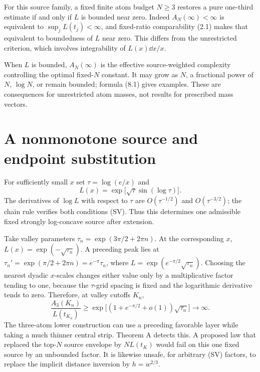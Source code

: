For this source family, a fixed finite atom budget $N\ge3$ restores a pure one-third estimate if and only if $L$ is bounded near zero. Indeed $A_N(\infty)<\infty$ is equivalent to $\sup_j L(t_j)<\infty$, and fixed-ratio comparability (2.1) makes that equivalent to boundedness of $L$ near zero. This differs from the unrestricted criterion, which involves integrability of $L(x)\dd x/x$.

When $L$ is bounded, $A_N(\infty)$ is the effective source-weighted complexity controlling the optimal fixed-$N$ constant. It may grow as $N$, a fractional power of $N$, $\log N$, or remain bounded; formula (8.1) gives examples. These are consequences for unrestricted atom masses, not results for prescribed mass vectors.

\section{A nonmonotone source and endpoint substitution}
For sufficiently small $x$ set $\tau=\log(e/x)$ and
\begin{equation}
 L(x)=\exp\bigl[\sqrt\tau\sin(\log\tau)\bigr].\tag{10.1}
\end{equation}
The derivatives of $\log L$ with respect to $\tau$ are $O(\tau^{-1/2})$ and $O(\tau^{-3/2})$; the chain rule verifies both conditions (SV). Thus this determines one admissible fixed strongly log-concave source after extension.

Take valley parameters $\tau_n=\exp(3\pi/2+2\pi n)$. At the corresponding $x$, $L(x)=\exp(-\sqrt{\tau_n})$. A preceding peak lies at $\tau_n'=\exp(\pi/2+2\pi n)=e^{-\pi}\tau_n$, where $L=\exp(e^{-\pi/2}\sqrt{\tau_n})$. Choosing the nearest dyadic $x$-scales changes either value only by a multiplicative factor tending to one, because the $\tau$-grid spacing is fixed and the logarithmic derivative tends to zero. Therefore, at valley cutoffs $K_n$,
\begin{equation}
 \frac{A_3(K_n)}{L(t_{K_n})}
 \ge\exp\bigl[(1+e^{-\pi/2}+o(1))\sqrt{\tau_n}\bigr]\longrightarrow\infty.
 \tag{10.2}
\end{equation}
The three-atom lower construction can use a preceding favorable layer while taking a much thinner central strip. Theorem A detects this. A proposed law that replaced the top-$N$ source envelope by $NL(t_K)$ would fail on this one fixed source by an unbounded factor. It is likewise unsafe, for arbitrary (SV) factors, to replace the implicit distance inversion by $h=w^{2/3}$.

